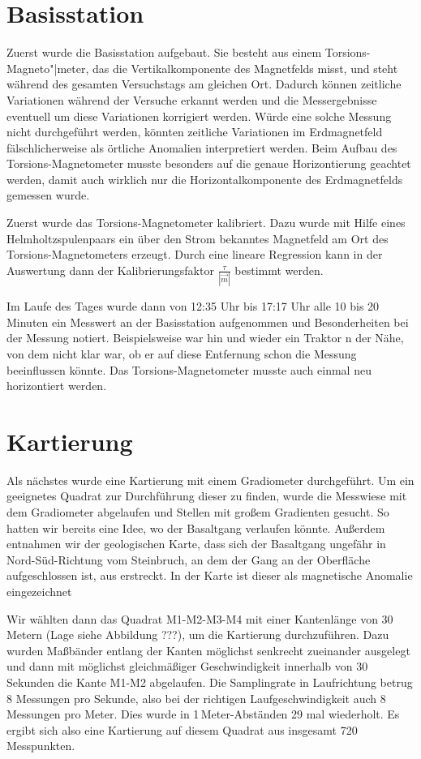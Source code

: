 \section{Basisstation}

Zuerst wurde die Basisstation aufgebaut. Sie besteht aus einem Torsions-Magneto"|meter, das die Vertikalkomponente des Magnetfelds misst, und steht während des gesamten Versuchstags am gleichen Ort. Dadurch können zeitliche Variationen während der Versuche erkannt werden und die Messergebnisse eventuell um diese Variationen korrigiert werden. Würde eine solche Messung nicht durchgeführt werden, könnten zeitliche Variationen im Erdmagnetfeld fälschlicherweise als örtliche Anomalien interpretiert werden. Beim Aufbau des Torsions-Magnetometer musste besonders auf die genaue Horizontierung geachtet werden, damit auch wirklich nur die Horizontalkomponente des Erdmagnetfelds gemessen wurde.

Zuerst wurde das Torsions-Magnetometer kalibriert. Dazu wurde mit Hilfe eines Helmholtzspulenpaars ein über den Strom bekanntes Magnetfeld am Ort des Torsions-Magnetometers erzeugt. Durch eine lineare Regression kann in der Auswertung dann der Kalibrierungsfaktor $\frac{\tau}{|\vec{m}|}$ bestimmt werden.

Im Laufe des Tages wurde dann von 12:35 Uhr bis 17:17 Uhr alle 10 bis 20 Minuten ein Messwert an der Basisstation aufgenommen und Besonderheiten bei der Messung notiert. Beispielsweise war hin und wieder ein Traktor n der Nähe, von dem nicht klar war, ob er auf diese Entfernung schon  die Messung beeinflussen könnte. Das Torsions-Magnetometer musste auch einmal neu horizontiert werden.

\section{Kartierung}

Als nächstes wurde eine Kartierung mit einem Gradiometer durchgeführt. Um ein geeignetes Quadrat zur Durchführung dieser zu finden, wurde die Messwiese mit dem Gradiometer abgelaufen und Stellen mit großem Gradienten gesucht. So hatten wir bereits eine Idee, wo der Basaltgang verlaufen könnte. Außerdem entnahmen wir der geologischen Karte, dass sich der Basaltgang ungefähr in Nord-Süd-Richtung vom Steinbruch, an dem der Gang an der Oberfläche aufgeschlossen ist, aus erstreckt. In der Karte ist dieser als magnetische Anomalie eingezeichnet

Wir wählten dann das Quadrat M1-M2-M3-M4 mit einer Kantenlänge von 30 Metern (Lage siehe Abbildung ???), um die Kartierung durchzuführen. Dazu wurden Maßbänder entlang der Kanten möglichst senkrecht zueinander ausgelegt und dann mit möglichst gleichmäßiger Geschwindigkeit innerhalb von 30 Sekunden die Kante M1-M2 abgelaufen. Die Samplingrate in Laufrichtung betrug 8 Messungen pro Sekunde, also bei der richtigen Laufgeschwindigkeit auch 8 Messungen pro Meter. Dies wurde in 1\,Meter-Abständen 29 mal wiederholt. Es ergibt sich also eine Kartierung auf diesem Quadrat aus insgesamt 720 Messpunkten.


